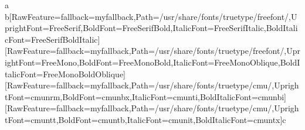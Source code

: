 


\label{0}

a{\,}b\allowbreak{}\setmainfont{FreeSerif.ttf}[RawFeature={fallback=myfallback},Path=/usr/share/fonts/truetype/freefont/,UprightFont=FreeSerif,BoldFont=FreeSerifBold,ItalicFont=FreeSerifItalic,BoldItalicFont=FreeSerifBoldItalic]\setmonofont{FreeSerif.ttf}[RawFeature={fallback=myfallback},Path=/usr/share/fonts/truetype/freefont/,UprightFont=FreeMono,BoldFont=FreeMonoBold,ItalicFont=FreeMonoOblique,BoldItalicFont=FreeMonoBoldOblique]\,\allowbreak{}\setmainfont{cmunrm.ttf}[RawFeature={fallback=myfallback},Path=/usr/share/fonts/truetype/cmu/,UprightFont=cmunrm,BoldFont=cmunbx,ItalicFont=cmunti,BoldItalicFont=cmunbi]\setmonofont{cmunrm.ttf}[RawFeature={fallback=myfallback},Path=/usr/share/fonts/truetype/cmu/,UprightFont=cmuntt,BoldFont=cmuntb,ItalicFont=cmunit,BoldItalicFont=cmuntx]c


